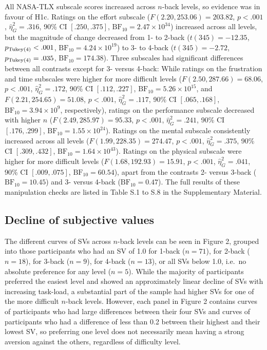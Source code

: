 \documentclass[
  man,floatsintext]{apa6}
\begin{document}
All NASA-TLX subscale scores increased across \(n\)-back levels, so evidence was in favour of H1c.
Ratings on the effort subscale (\(F(2.20, 253.06) = 203.82\), \(p < .001\), \(\hat{\eta}^2_G = .316\), 90\% CI \([.250, .375]\), \(\mathrm{BF}_{\textrm{10}} = 2.47 \times 10^{34}\)) increased across all levels, but the magnitude of change decreased from 1- to 2-back (\(t(345) = -12.35\), \(p_\mathrm{\scriptsize Tukey(4)} < .001\), \(\mathrm{BF}_{\textrm{10}} = 4.24 \times 10^{19}\)) to 3- to 4-back (\(t(345) = -2.72\), \(p_\mathrm{\scriptsize Tukey(4)} = .035\), \(\mathrm{BF}_{\textrm{10}} = 174.38\)).
Three subscales had significant differences between all contrasts except for 3- versus 4-back:
While ratings on the frustration and time subscales were higher for more difficult levels (\(F(2.50, 287.66) = 68.06\), \(p < .001\), \(\hat{\eta}^2_G = .172\), 90\% CI \([.112, .227]\), \(\mathrm{BF}_{\textrm{10}} = 5.26 \times 10^{15}\), and \(F(2.21, 254.65) = 51.08\), \(p < .001\), \(\hat{\eta}^2_G = .117\), 90\% CI \([.065, .168]\), \(\mathrm{BF}_{\textrm{10}} = 3.94 \times 10^{9}\), respectively), ratings on the performance subscale decreased with higher \(n\) (\(F(2.49, 285.97) = 95.33\), \(p < .001\), \(\hat{\eta}^2_G = .241\), 90\% CI \([.176, .299]\), \(\mathrm{BF}_{\textrm{10}} = 1.55 \times 10^{24}\)).
Ratings on the mental subscale consistently increased across all levels (\(F(1.99, 228.35) = 274.47\), \(p < .001\), \(\hat{\eta}^2_G = .375\), 90\% CI \([.309, .432]\), \(\mathrm{BF}_{\textrm{10}} = 1.64 \times 10^{43}\)).
Ratings on the physical subscale were higher for more difficult levels (\(F(1.68, 192.93) = 15.91\), \(p < .001\), \(\hat{\eta}^2_G = .041\), 90\% CI \([.009, .075]\), \(\mathrm{BF}_{\textrm{10}} = 60.54\)), apart from the contrasts 2- versus 3-back (\(\mathrm{BF}_{\textrm{10}} = 10.45\)) and 3- versus 4-back (\(\mathrm{BF}_{\textrm{10}} = 0.47\)).
The full results of these manipulation checks are listed in Table S.1 to S.8 in the Supplementary Material.

\hypertarget{decline-of-subjective-values}{%
\subsection{Decline of subjective values}\label{decline-of-subjective-values}}

The different curves of SVs across \(n\)-back levels can be seen in Figure 2, grouped into those participants who had an SV of 1.0 for 1-back (\(n=71\)), for 2-back (\(n=18\)), for 3-back (\(n=9\)), for 4-back (\(n=13\)), or all SVs below 1.0, i.e.~no absolute preference for any level (\(n=5\)).
While the majority of participants preferred the easiest level and showed an approximately linear decline of SVs with increasing task-load, a substantial part of the sample had higher SVs for one of the more difficult \(n\)-back levels.
However, each panel in Figure 2 contains curves of participants who had large differences between their four SVs and curves of participants who had a difference of less than 0.2 between their highest and their lowest SV, so preferring one level does not necessarily mean having a strong aversion against the others, regardless of difficulty level.
\end{document}
